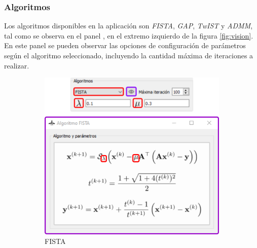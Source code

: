 \documentclass[12pt,twoside,letter]{ol-softwaremanual}
\newcommand*\circled[1]{\tikz[baseline=(char.base)]{
            \node[shape=circle,draw,inner sep=2pt] (char) {#1};}}
\begin{document}
\subsubsection{Algoritmos}

Los algoritmos disponibles en la aplicación son \emph{FISTA}, \emph{GAP}, \emph{TwIST} y \emph{ADMM}, tal como se observa en el panel \circled{3}, en el extremo izquierdo de la figura \ref{fig:vision}. En este panel se pueden observar las opciones de configuración de parámetros según el algoritmo seleccionado, incluyendo la cantidad máxima de iteraciones a realizar. 

\begin{figure}[!ht]
     \centering
     \begin{subfigure}[b]{0.47\textwidth}
         \centering
         \includegraphics[width=\textwidth]{algorithm-fista.png}
         \caption{FISTA}
         \label{fig:fista}
     \end{subfigure}
     \hfill
     \begin{subfigure}[b]{0.47\textwidth}
         \centering

\end{subfigure}
\end{figure}
\end{document}
